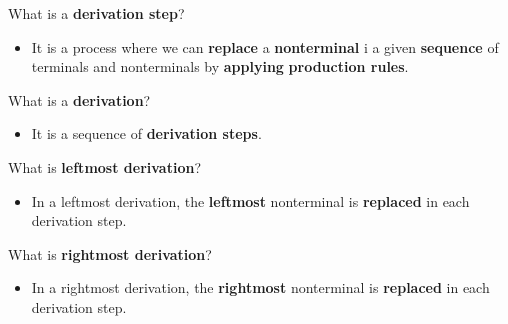\documentclass[11pt]{beamer}
\begin{document}
\begin{frame}


\begin{block}{What is a \textbf{derivation step}?}
\begin{itemize}
\item It is a process where we can \textbf{replace} a \textbf{nonterminal} i a given \textbf{sequence} of terminals and nonterminals by \textbf{applying} \textbf{production rules}.
\end{itemize}
\end{block}

\begin{block}{What is a \textbf{derivation}?}
\begin{itemize}
\item It is a sequence of \textbf{derivation steps}.
\end{itemize}
\end{block}

\begin{block}{What is \textbf{leftmost derivation}?}
\begin{itemize}
\item In a leftmost derivation, the \textbf{leftmost} nonterminal is \textbf{replaced} in each derivation step.
\end{itemize}
\end{block}

\begin{block}{What is \textbf{rightmost derivation}?}
\begin{itemize}
\item In a rightmost derivation, the \textbf{rightmost} nonterminal is \textbf{replaced} in each derivation step.
\end{itemize}
\end{block}


\end{frame}
\end{document}
